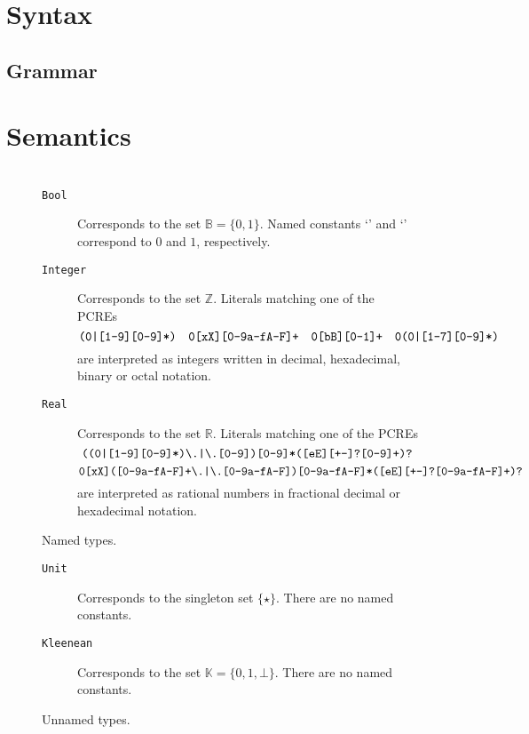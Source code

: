 \documentclass[a4paper,11pt,parskip=half]{scrartcl}
\newcommand*\lang[1]{\text`\textcolor{blue}{\text{\ttfamily{#1}}}\text'{}}
\begin{document}
\section{Syntax}
\subsection{Grammar}


\section{Semantics}

\newpage
\appendix
\section{}

\begin{figure}
\begin{description}
\item[\texttt{Bool}]
	Corresponds to the set $\mathbb B=\{0,1\}$.
	Named constants \lang{False} and \lang{True} correspond to $0$ and
	$1$, respectively.
\item[\texttt{Integer}]
	Corresponds to the set $\mathbb Z$. Literals matching one of the PCREs
	\[
		\verb#(0|[1-9][0-9]*)# \quad \verb#0[xX][0-9a-fA-F]+# \quad
		\verb#0[bB][0-1]+# \quad \verb#0(0|[1-7][0-9]*)#
	\]
	are interpreted as integers written in decimal, hexadecimal, binary or
	octal notation.
\item[\texttt{Real}]
	Corresponds to the set $\mathbb R$. Literals matching one of the PCREs
	\[ \verb#((0|[1-9][0-9]*)\.|\.[0-9])[0-9]*([eE][+-]?[0-9]+)?# \]
	\[ \verb#0[xX]([0-9a-fA-F]+\.|\.[0-9a-fA-F])[0-9a-fA-F]*([eE][+-]?[0-9a-fA-F]+)?# \]
	are interpreted as rational numbers in fractional decimal or hexadecimal
	notation.
\end{description}
\caption{Named types.}
\label{fig:named-types}
\end{figure}

\begin{figure}
\begin{description}
\item[\texttt{Unit}]
	Corresponds to the singleton set $\{\star\}$.
	There are no named constants.
\item[\texttt{Kleenean}]
	Corresponds to the set $\mathbb K=\{0,1,\bot\}$.
	There are no named constants.
\end{description}
\caption{Unnamed types.}
\label{fig:unnamed-types}
\end{figure}
\end{document}
